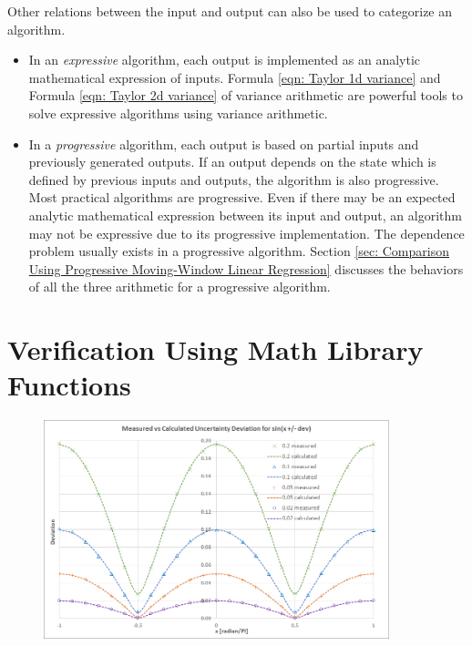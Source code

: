 \documentclass[twoside]{article}
\numberwithin{equation}{section}
\begin{document}
Other relations between the input and output can also be used to categorize an algorithm.  
\begin{itemize}
\item  In an \emph{expressive} algorithm, each output is implemented as an analytic mathematical expression of inputs.  
Formula \eqref{eqn: Taylor 1d variance} and Formula \eqref{eqn: Taylor 2d variance} of variance arithmetic are powerful tools to solve expressive algorithms using variance arithmetic.  

\item  In a \emph{progressive} algorithm, each output is based on partial inputs and previously generated outputs.  
If an output depends on the state which is defined by previous inputs and outputs, the algorithm is also progressive.  
Most practical algorithms are progressive.  
Even if there may be an expected analytic mathematical expression between its input and output, an algorithm may not be expressive due to its progressive implementation.  
The dependence problem usually exists in a progressive algorithm.  
Section \ref{sec: Comparison Using Progressive Moving-Window Linear Regression} discusses the behaviors of all the three arithmetic for a progressive algorithm.
\end{itemize}




\clearpage
\section{Verification Using Math Library Functions}
\label{sec: Math Library}

\begin{figure}[p]
\centering
\includegraphics[height=2.5in]{Sin_Dev.png} 
\label{fig: Sin_Dev}
\end{figure}
\end{document}
